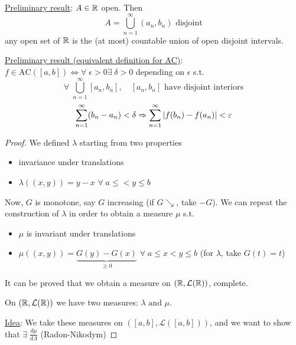 \underline{Preliminary result}: \(A \in \mathbb{R}\) open. Then 
\[
    A = \bigcup_{n=1}^{\infty}(a_n, b_n) \mbox{ disjoint}
\]
    any open set of \(\mathbb{R}\) is the (at most) countable union of open disjoint intervals.

\underline{Preliminary result (equivalent definition for AC)}: \(f \in \mbox{AC}([a,b]) \Leftrightarrow \forall \; \epsilon > 0 \exists \; \delta > 0\) depending on \(\epsilon\) s.t. 
\[
    \forall \; \bigcup_{n=1}^{\infty} [a_n, b_n], \quad [a_n, b_n] \mbox{ have disjoint interiors}
\]
\[
    \sum_{n=1}^{\infty} (b_n -a_n) < \delta \Rightarrow \sum_{n=1}^{\infty} \abs{f(b_n) - f(a_n)} < \varepsilon
\]
\begin{proof}
    We defined \(\lambda\) starting from two properties
    \begin{itemize}
        \item invariance under translations
        \item \(\lambda((x,y)) = y - x\) \(\forall \; a \leq < y \leq b\)
    \end{itemize}
    Now, \(G\) is monotone, say \(G\) increasing (if \(G \searrow\), take \(-G\)). We can repeat the construction of \(\lambda\) in order to obtain a measure \(\mu\) s.t. 
    \begin{itemize}
        \item \(\mu\) is invariant under translations
        \item \(\mu((x,y)) = \underbrace{G(y) - G(x)}_{\geq 0}\) \(\forall \; a \leq x < y \leq b\) (for \(\lambda\), take \(G(t) = t\))
    \end{itemize}
It can be proved that we obtain a measure on \((\mathbb{R}, \mathcal{L}(\mathbb{R}))\), complete.

On \((\mathbb{R}, \mathcal{L}(\mathbb{R}))\) we have two measures: \(\lambda \mbox{ and } \mu\).

\underline{Idea}: We take these measures on \(([a,b], \mathcal{L}([a,b]))\), and we want to show that \(\exists \; \frac{d\mu}{d\Lambda}\) (Radon-Nikodym)


\end{proof}
